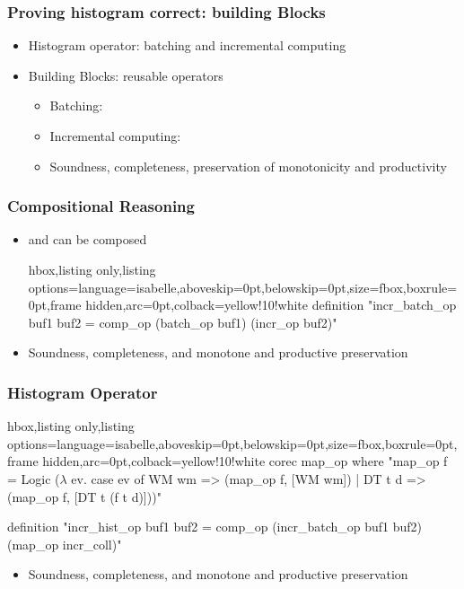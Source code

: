 \documentclass[aspectratio=169,10pt]{beamer}
\begin{document}
\begin{frame}[fragile]
  \frametitle{Proving histogram correct: building Blocks}
  \begin{itemize}
    \item Histogram operator: batching and incremental computing
    \item Building Blocks: reusable operators
          \begin{itemize}
            \item Batching: 
            \item Incremental computing: 
            \item Soundness, completeness, preservation of monotonicity and productivity
          \end{itemize}
  \end{itemize}
\end{frame}

\begin{frame}[fragile]
  \frametitle{Compositional Reasoning}
  \begin{itemize}
    \item {} and  can be composed
          \vspace*{-1ex}
          \begin{tcblisting}{hbox,listing only,listing options={language=isabelle,aboveskip=0pt,belowskip=0pt},size=fbox,boxrule=0pt,frame hidden,arc=0pt,colback=yellow!10!white}
definition "incr_batch_op buf1 buf2 = comp_op (batch_op buf1) (incr_op buf2)"
          \end{tcblisting}
          \vspace*{-1ex}
    \item Soundness, completeness, and monotone and productive preservation
  \end{itemize}
\end{frame}

\begin{frame}[fragile]
  \frametitle{Histogram Operator}
  \vspace*{-1ex}
  \begin{tcblisting}{hbox,listing only,listing options={language=isabelle,aboveskip=0pt,belowskip=0pt},size=fbox,boxrule=0pt,frame hidden,arc=0pt,colback=yellow!10!white}
corec map_op where "map_op f = Logic ($\lambda$ ev. case ev of
WM wm => (map_op f, [WM wm]) | DT t d => (map_op f, [DT t (f t d)]))"

definition "incr_hist_op buf1 buf2 =
comp_op (incr_batch_op buf1 buf2) (map_op incr_coll)"
  \end{tcblisting}
  \begin{itemize}
    \item Soundness, completeness, and monotone and productive preservation
  \end{itemize}
  \vspace*{-1ex}

\end{frame}
\end{document}
